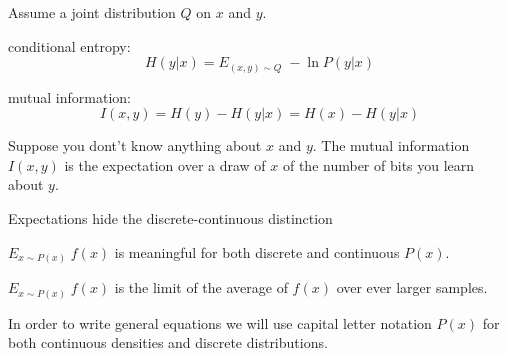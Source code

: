 {


Assume a joint distribution $Q$  on $x$ and $y$.

\vfill
conditional entropy:
$$H(y|x) = E_{(x,y)\sim Q}\;-\ln P(y|x)$$

\vfill
mutual information:
$$I(x,y) = H(y) - H(y|x) = H(x) - H(y|x)$$

\vfill
Suppose you dont't know anything about $x$ and $y$. The mutual information $I(x,y)$ is the expectation over a draw of $x$ of
the number of bits you learn about $y$.


Expectations hide the discrete-continuous distinction

\vfill
$E_{x \sim P(x)}\;f(x)$ is meaningful for both discrete and continuous $P(x)$.

\vfill
$E_{x \sim P(x)}\;f(x)$ is the limit of the average of $f(x)$ over ever larger samples.

\vfill
In order to write general equations we will use capital letter notation $P(x)$ for both continuous densities and discrete distributions.

}
